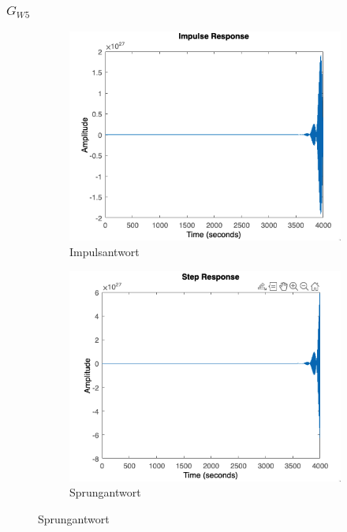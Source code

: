 \documentclass{article}
\begin{document}
 				\subsubsection{$G_{W5}$}
 					\begin{figure}[h]
 						\begin{subfigure}{0.5\textwidth}
 							\includegraphics[width=1\linewidth]{./Impulsantwort_GW5.png}
						    \caption{Impulsantwort}
						    \label{fig:subimg5_1}
					    \end{subfigure}
					    \begin{subfigure}{0.5\textwidth}
					    		\includegraphics[width=1\linewidth]{./Sprungantwort_GW5.png}
					    		\caption{Sprungantwort}
					    		\label{fig:subimg5_2}
					    \end{subfigure}
 					\end{figure}
 				
\end{document}
